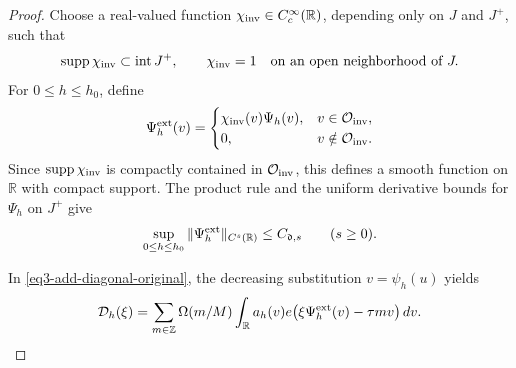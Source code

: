 \documentclass[reqno,12pt]{amsart}
\def \Z {\mathbb Z}
\def \R {\mathbb R}
\numberwithin{equation}{section}
\begin{document}
\begin{proof}

Choose a real-valued function $\chi_{\rm inv}\in C_c^\infty(\R)$,
depending only on $J$ and $J^+$, such that
\[
\operatorname{supp}\chi_{\rm inv}\subset\operatorname{int}J^+,
\qquad
\chi_{\rm inv}=1 \quad\text{on an open neighborhood of }J.
\]
For $0\le h\le h_0$, define
\[
\Psi_h^{\rm ext}(v)=
\begin{cases}
\chi_{\rm inv}(v)\Psi_h(v),&v\in\mathcal O_{\rm inv},\\
0,&v\notin\mathcal O_{\rm inv}.
\end{cases}
\]
Since $\operatorname{supp}\chi_{\rm inv}$ is compactly contained
in $\mathcal O_{\rm inv}$, this defines a smooth function on
$\R$ with compact support. The product rule and the uniform
derivative bounds for $\Psi_h$ on $J^+$ give
\[
\sup_{0\le h\le h_0}
\|\Psi_h^{\rm ext}\|_{C^s(\R)}
\le C_{\mathfrak d,s}
\qquad(s\ge 0).
\]

In \eqref{eq3-add-diagonal-original}, the decreasing substitution
$v=\psi_h(u)$ yields
\begin{equation}
 \mathcal D_h(\xi)=\sum_{m\in\Z}\Omega(m/M)
 \int_\R a_h(v)e\bigl(\xi\Psi_h^{\rm ext}(v)-\tau mv\bigr)\,dv.
 \label{eq3-add-diagonal-inverse}
\end{equation}


\end{proof}
\end{document}
